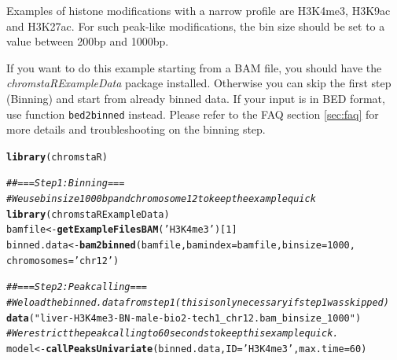 \documentclass[11pt]{article}\usepackage[]{graphicx}\usepackage[]{color}
\makeatletter
\newcommand{\hlnum}[1]{\textcolor[rgb]{0.686,0.059,0.569}{#1}}%
\newcommand{\hlstr}[1]{\textcolor[rgb]{0.192,0.494,0.8}{#1}}%
\newcommand{\hlcom}[1]{\textcolor[rgb]{0.678,0.584,0.686}{\textit{#1}}}%
\newcommand{\hlstd}[1]{\textcolor[rgb]{0.345,0.345,0.345}{#1}}%
\newcommand{\hlkwb}[1]{\textcolor[rgb]{0.69,0.353,0.396}{#1}}%
\newcommand{\hlkwc}[1]{\textcolor[rgb]{0.333,0.667,0.333}{#1}}%
\newcommand{\hlkwd}[1]{\textcolor[rgb]{0.737,0.353,0.396}{\textbf{#1}}}%
\newenvironment{kframe}{%
 \def\at@end@of@kframe{}%
 \ifinner\ifhmode%
  \def\at@end@of@kframe{\end{minipage}}%
  \begin{minipage}{\columnwidth}%
 \fi\fi%
 \def\FrameCommand##1{\hskip\@totalleftmargin \hskip-\fboxsep
 \colorbox{shadecolor}{##1}\hskip-\fboxsep
     \hskip-\linewidth \hskip-\@totalleftmargin \hskip\columnwidth}%
 \MakeFramed {\advance\hsize-\width
   \@totalleftmargin\z@ \linewidth\hsize
   \@setminipage}}%
 {\par\unskip\endMakeFramed%
 \at@end@of@kframe}
\newenvironment{knitrout}{}{} %
\newcommand{\Rfunction}[1]{{\texttt{#1}}}
\newcommand{\Rpackage}[1]{{\textit{#1}}}
\makeatother
\begin{document}
Examples of histone modifications with a narrow profile are H3K4me3, H3K9ac and H3K27ac. For such peak-like modifications, the bin size should be set to a value between 200bp and 1000bp.

If you want to do this example starting from a BAM file, you should have the \Rpackage{chromstaRExampleData} package installed. Otherwise you can skip the first step (Binning) and start from already binned data. If your input is in BED format, use function \Rfunction{bed2binned} instead. Please refer to the FAQ section \ref{sec:faq} for more details and troubleshooting on the binning step.

\begin{scriptsize}
\begin{knitrout}
\color{fgcolor}\begin{kframe}
\begin{alltt}
\hlkwd{library}\hlstd{(chromstaR)}
\end{alltt}
\end{kframe}
\end{knitrout}

\begin{knitrout}
\color{fgcolor}\begin{kframe}
\begin{alltt}
\hlcom{## === Step 1: Binning ===}
\hlcom{# We use bin size 1000bp and chromosome 12 to keep the example quick}
\hlkwd{library}\hlstd{(chromstaRExampleData)}
\hlstd{bamfile} \hlkwb{<-} \hlkwd{getExampleFilesBAM}\hlstd{(}\hlstr{'H3K4me3'}\hlstd{)[}\hlnum{1}\hlstd{]}
\hlstd{binned.data} \hlkwb{<-} \hlkwd{bam2binned}\hlstd{(bamfile,} \hlkwc{bamindex}\hlstd{=bamfile,} \hlkwc{binsize}\hlstd{=}\hlnum{1000}\hlstd{,}
                          \hlkwc{chromosomes}\hlstd{=}\hlstr{'chr12'}\hlstd{)}
\end{alltt}
\end{kframe}
\end{knitrout}

\begin{knitrout}
\color{fgcolor}\begin{kframe}
\begin{alltt}
\hlcom{## === Step 2: Peak calling ===}
\hlcom{# We load the binned.data from step 1 (this is only necessary if step 1 was skipped)}
\hlkwd{data}\hlstd{(}\hlstr{"liver-H3K4me3-BN-male-bio2-tech1_chr12.bam_binsize_1000"}\hlstd{)}
\hlcom{# We restrict the peak calling to 60 seconds to keep this example quick.}
\hlstd{model} \hlkwb{<-} \hlkwd{callPeaksUnivariate}\hlstd{(binned.data,} \hlkwc{ID}\hlstd{=}\hlstr{'H3K4me3'}\hlstd{,} \hlkwc{max.time}\hlstd{=}\hlnum{60}\hlstd{)}
\end{alltt}



\end{kframe}
\end{knitrout}
\end{scriptsize}
\end{document}

